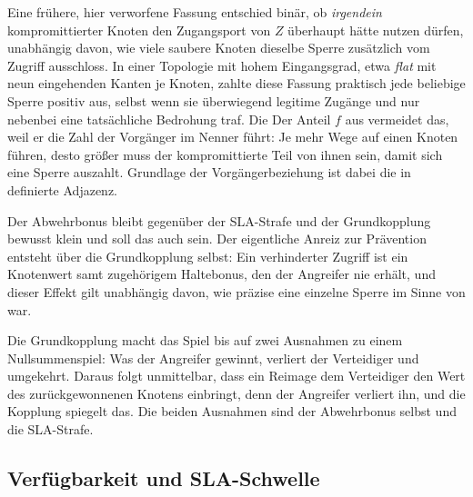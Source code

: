 Eine frühere, hier verworfene Fassung entschied binär, ob \emph{irgendein}
kompromittierter Knoten den Zugangsport von $Z$ überhaupt hätte nutzen dürfen,
unabhängig davon, wie viele saubere Knoten dieselbe Sperre zusätzlich vom
Zugriff ausschloss. In einer Topologie mit hohem Eingangsgrad, etwa
\emph{flat} mit neun eingehenden Kanten je Knoten, zahlte diese Fassung
praktisch jede beliebige Sperre positiv aus, selbst wenn sie überwiegend
legitime Zugänge und nur nebenbei eine tatsächliche Bedrohung traf. Die
Der Anteil $f$ aus  vermeidet das, weil er die Zahl der
Vorgänger im Nenner führt: Je mehr Wege auf einen Knoten führen, desto größer
muss der kompromittierte Teil von ihnen sein, damit sich eine Sperre auszahlt.
Grundlage der Vorgängerbeziehung ist dabei die in 
definierte Adjazenz.

Der Abwehrbonus bleibt gegenüber der \ac{SLA}-Strafe und der Grundkopplung
bewusst klein und soll das auch sein. Der eigentliche Anreiz zur Prävention
entsteht über die Grundkopplung selbst: Ein verhinderter Zugriff ist ein
Knotenwert samt zugehörigem Haltebonus, den der Angreifer nie erhält, und
dieser Effekt gilt unabhängig davon, wie präzise eine einzelne Sperre im Sinne
von  war.

Die Grundkopplung macht das Spiel bis auf zwei Ausnahmen zu einem
Nullsummenspiel: Was der Angreifer gewinnt, verliert der Verteidiger und
umgekehrt. Daraus folgt unmittelbar, dass ein Reimage dem Verteidiger den Wert
des zurückgewonnenen Knotens einbringt, denn der Angreifer verliert ihn, und
die Kopplung spiegelt das. Die beiden Ausnahmen sind der Abwehrbonus selbst
und die \ac{SLA}-Strafe.

\subsection{Verfügbarkeit und \acs{SLA}-Schwelle}
\label{sec:sla}

